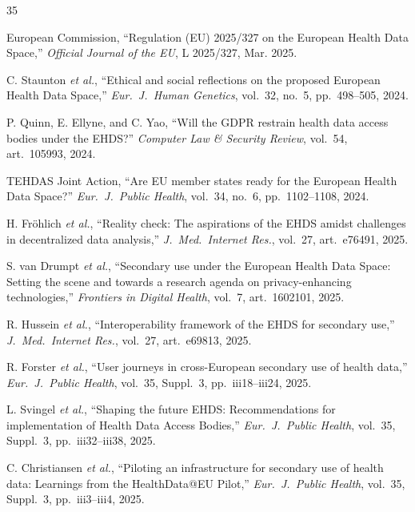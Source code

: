 \documentclass[conference]{IEEEtran}
\begin{document}
\begin{thebibliography}{35}

European Commission, ``Regulation (EU) 2025/327 on the European Health Data Space,'' \textit{Official Journal of the EU}, L 2025/327, Mar. 2025.

C. Staunton \textit{et al.}, ``Ethical and social reflections on the proposed European Health Data Space,'' \textit{Eur.~J.~Human Genetics}, vol.~32, no.~5, pp.~498--505, 2024.

P. Quinn, E. Ellyne, and C. Yao, ``Will the GDPR restrain health data access bodies under the EHDS?'' \textit{Computer Law \& Security Review}, vol.~54, art.~105993, 2024.

TEHDAS Joint Action, ``Are EU member states ready for the European Health Data Space?'' \textit{Eur.~J.~Public Health}, vol.~34, no.~6, pp.~1102--1108, 2024.

H. Fr\"ohlich \textit{et al.}, ``Reality check: The aspirations of the EHDS amidst challenges in decentralized data analysis,'' \textit{J.~Med.~Internet Res.}, vol.~27, art.~e76491, 2025.

S. van Drumpt \textit{et al.}, ``Secondary use under the European Health Data Space: Setting the scene and towards a research agenda on privacy-enhancing technologies,'' \textit{Frontiers in Digital Health}, vol.~7, art.~1602101, 2025.

R. Hussein \textit{et al.}, ``Interoperability framework of the EHDS for secondary use,'' \textit{J.~Med.~Internet Res.}, vol.~27, art.~e69813, 2025.

R. Forster \textit{et al.}, ``User journeys in cross-European secondary use of health data,'' \textit{Eur.~J.~Public Health}, vol.~35, Suppl.~3, pp.~iii18--iii24, 2025.

L. Svingel \textit{et al.}, ``Shaping the future EHDS: Recommendations for implementation of Health Data Access Bodies,'' \textit{Eur.~J.~Public Health}, vol.~35, Suppl.~3, pp.~iii32--iii38, 2025.

C. Christiansen \textit{et al.}, ``Piloting an infrastructure for secondary use of health data: Learnings from the HealthData@EU Pilot,'' \textit{Eur.~J.~Public Health}, vol.~35, Suppl.~3, pp.~iii3--iii4, 2025.


\end{thebibliography}
\end{document}
